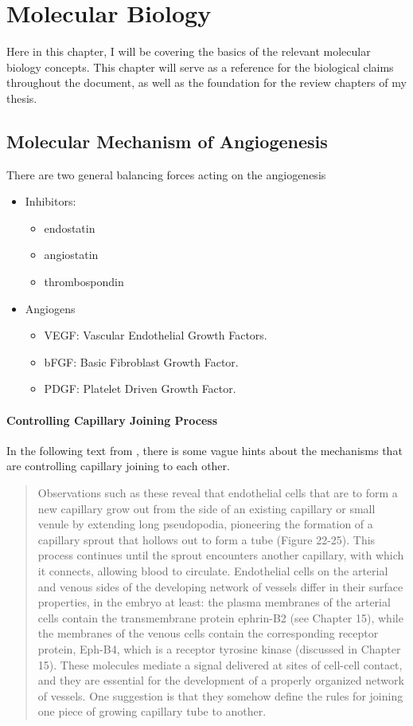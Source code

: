 \chapter{Molecular Biology}
Here in this chapter, I will be covering the basics of the relevant molecular biology concepts. This chapter will serve as a reference for the biological claims throughout the document, as well as the foundation for the review chapters of my thesis.

\section{Molecular Mechanism of Angiogenesis}
There are two general balancing forces acting on the angiogenesis
\begin{itemize}
	\item Inhibitors:
	\begin{itemize}
		\item endostatin
		\item angiostatin
		\item thrombospondin
	\end{itemize} 
	\item Angiogens
	\begin{itemize}
		\item VEGF: Vascular Endothelial Growth Factors.
		\item bFGF: Basic Fibroblast Growth Factor.
		\item PDGF: Platelet Driven Growth Factor.
	\end{itemize}
\end{itemize}


\subsubsection*{Controlling Capillary Joining Process}
In the following text from \cite{Alberts2002}, there is some vague hints about the mechanisms that are controlling capillary joining to each other.


\begin{quote}
	Observations such as these reveal that endothelial cells that are to form a new capillary grow out from the side of an existing capillary or small venule by extending long pseudopodia, pioneering the formation of a capillary sprout that hollows out to form a tube (Figure 22-25). This process continues until the sprout encounters another capillary, with which it connects, allowing blood to circulate. Endothelial cells on the arterial and venous sides of the developing network of vessels differ in their surface properties, in the embryo at least: the plasma membranes of the arterial cells contain the transmembrane protein ephrin-B2 (see Chapter 15), while the membranes of the venous cells contain the corresponding receptor protein, Eph-B4, which is a receptor tyrosine kinase (discussed in Chapter 15). These molecules mediate a signal delivered at sites of cell-cell contact, and they are essential for the development of a properly organized network of vessels. One suggestion is that they somehow define the rules for joining one piece of growing capillary tube to another.

\end{quote}

